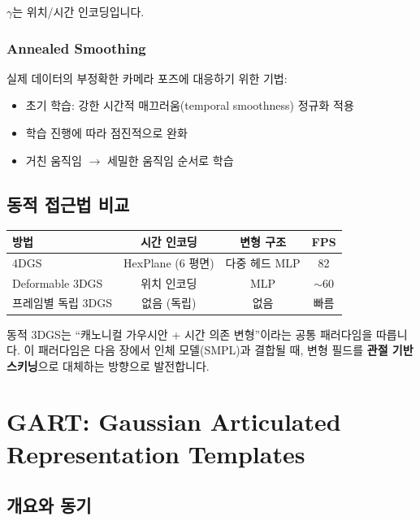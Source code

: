 \documentclass[11pt, a4paper]{report}
\begin{document}
$\gamma$는 위치/시간 인코딩입니다.

\subsection{Annealed Smoothing}

실제 데이터의 부정확한 카메라 포즈에 대응하기 위한 기법:
\begin{itemize}[leftmargin=*]
  \item 초기 학습: 강한 시간적 매끄러움(temporal smoothness) 정규화 적용
  \item 학습 진행에 따라 점진적으로 완화
  \item 거친 움직임 $\rightarrow$ 세밀한 움직임 순서로 학습
\end{itemize}


\section{동적 접근법 비교}

\begin{center}
\renewcommand{\arraystretch}{1.3}
\begin{tabular}{lccc}
\toprule
\textbf{방법} & \textbf{시간 인코딩} & \textbf{변형 구조} & \textbf{FPS} \\
\midrule
4DGS & HexPlane (6 평면) & 다중 헤드 MLP & 82 \\
Deformable 3DGS & 위치 인코딩 & MLP & $\sim$60 \\
프레임별 독립 3DGS & 없음 (독립) & 없음 & 빠름 \\
\bottomrule
\end{tabular}
\end{center}

\begin{summary}
동적 3DGS는 ``캐노니컬 가우시안 + 시간 의존 변형''이라는 공통 패러다임을 따릅니다. 이 패러다임은 다음 장에서 인체 모델(SMPL)과 결합될 때, 변형 필드를 \textbf{관절 기반 스키닝}으로 대체하는 방향으로 발전합니다.
\end{summary}


\chapter{GART: Gaussian Articulated Representation Templates}
\label{ch:gart}

\section{개요와 동기}
\end{document}
